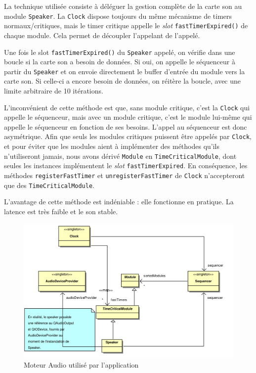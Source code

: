 La technique utilisée consiste à déléguer la gestion complète de la
carte son au module \verb!Speaker!. La \verb!Clock! dispose
toujours du même mécanisme de timers normaux/critiques, mais le
timer critique appelle le \emph{slot} \verb!fastTimerExpired()! de
chaque module. Cela permet de découpler l'appelant de l'appelé.

Une fois le slot \verb!fastTimerExpired()! du \verb!Speaker!
appelé, on vérifie dans une boucle si la carte son a besoin de
données. Si oui, on appelle le séquenceur à partir du
\verb!Speaker! et on envoie directement le buffer d'entrée du
module vers la carte son. Si celle-ci a encore besoin de données,
on réitère la boucle, avec une limite arbitraire de 10 itérations.

L'inconvénient de cette méthode est que, sans module critique,
c'est la \verb!Clock! qui appelle le séquenceur, mais avec un
module critique, c'est le module lui-même qui appelle le séquenceur
en fonction de ses besoins. L'appel au séquenceur est donc
asymétrique. Afin que seuls les modules critiques puissent être
appelés par \verb!Clock!, et pour éviter que les modules aient à
implémenter des méthodes qu'ils n'utiliseront jamais, nous avons
dérivé \verb!Module! en \verb!TimeCriticalModule!, dont seules les
instances implémentent le \emph{slot} \verb!fastTimerExpired!. En
conséquence, les méthodes \verb!registerFastTimer! et
\verb!unregisterFastTimer! de \verb!Clock! n'accepteront que des
\verb!TimeCriticalModule!.

L'avantage de cette méthode est indéniable : elle fonctionne en
pratique. La latence est très faible et le son stable.
\begin{figure}[htb]
\centering
\includegraphics[width=17cm]{../img/ps/psm_currentAudioEngine.pdf}
\caption{Moteur Audio utilisé par l'application}
\end{figure}

